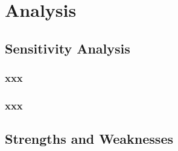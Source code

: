 \section{Analysis}\label{sec:analysis}

\subsection{Sensitivity Analysis}

\subsubsection{xxx}
\subsubsection{xxx}

\subsection{Strengths and Weaknesses}
